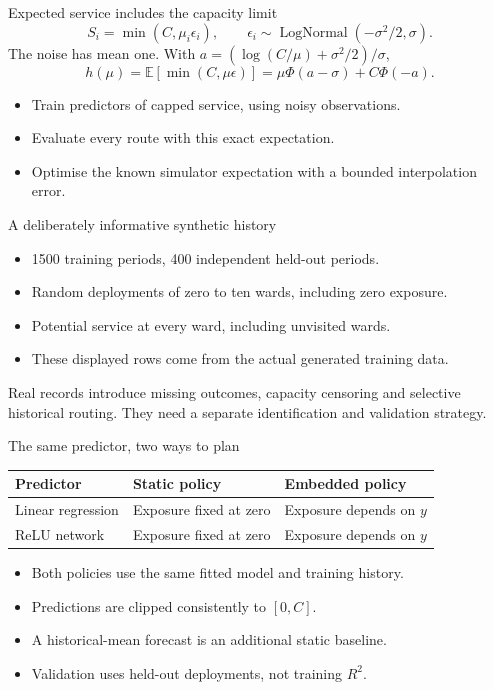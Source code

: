 \begin{frame}{Expected service includes the capacity limit}
  \[
    S_i=\min(C,\mu_i\epsilon_i),\qquad
    \epsilon_i\sim\operatorname{LogNormal}(-\sigma^2/2,\sigma).
  \]
  The noise has mean one. With $a=(\log(C/\mu)+\sigma^2/2)/\sigma$,
  \[
    h(\mu)=\mathbb E[\min(C,\mu\epsilon)]
           =\mu\Phi(a-\sigma)+C\Phi(-a).
  \]
  \begin{itemize}
    \item Train predictors of capped service, using noisy observations.
    \item Evaluate every route with this exact expectation.
    \item Optimise the known simulator expectation with a bounded interpolation error.
  \end{itemize}
\end{frame}

\begin{frame}{A deliberately informative synthetic history}
  \small
  \TrainingExample
  \vspace{3mm}
  \begin{itemize}
    \item 1500 training periods, 400 independent held-out periods.
    \item Random deployments of zero to ten wards, including zero exposure.
    \item Potential service at every ward, including unvisited wards.
    \item These displayed rows come from the actual generated training data.
  \end{itemize}
  \vspace{2mm}
  Real records introduce missing outcomes, capacity censoring and selective historical routing. They need a separate identification and validation strategy.
\end{frame}

\begin{frame}{The same predictor, two ways to plan}
  \begin{tabular}{lll}
    \toprule
    Predictor & Static policy & Embedded policy\\
    \midrule
    Linear regression & Exposure fixed at zero & Exposure depends on $y$\\[2mm]
    ReLU network & Exposure fixed at zero & Exposure depends on $y$\\
    \bottomrule
  \end{tabular}\par
  \vspace{4mm}
  \begin{itemize}
    \item Both policies use the same fitted model and training history.
    \item Predictions are clipped consistently to $[0,C]$.
    \item A historical-mean forecast is an additional static baseline.
    \item Validation uses held-out deployments, not training $R^2$.
  \end{itemize}
\end{frame}

